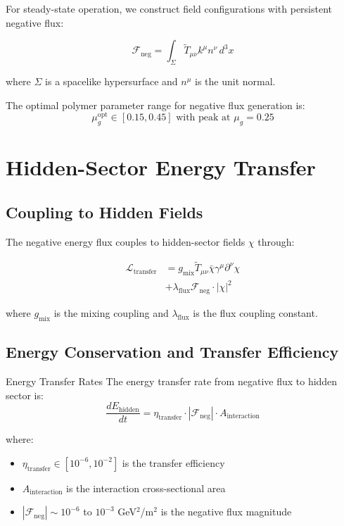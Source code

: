 \documentclass[12pt]{article}
\begin{document}
For steady-state operation, we construct field configurations with persistent negative flux:

\begin{equation}
\mathcal{F}_{\text{neg}} = \int_{\Sigma} \tilde{T}_{\mu\nu} k^{\mu} n^{\nu} \, d^3x
\end{equation}

where $\Sigma$ is a spacelike hypersurface and $n^{\mu}$ is the unit normal.

The optimal polymer parameter range for negative flux generation is:
\begin{equation}
\mu_g^{\text{opt}} \in [0.15, 0.45] \text{ with peak at } \mu_g = 0.25
\end{equation}

\section{Hidden-Sector Energy Transfer}

\subsection{Coupling to Hidden Fields}

The negative energy flux couples to hidden-sector fields $\chi$ through:

\begin{align}
\mathcal{L}_{\text{transfer}} &= g_{\text{mix}} \tilde{T}_{\mu\nu} \bar{\chi} \gamma^{\mu} \partial^{\nu} \chi \\
&+ \lambda_{\text{flux}} \mathcal{F}_{\text{neg}} \cdot |\chi|^2
\end{align}

where $g_{\text{mix}}$ is the mixing coupling and $\lambda_{\text{flux}}$ is the flux coupling constant.

\subsection{Energy Conservation and Transfer Efficiency}

\begin{resultbox}{Energy Transfer Rates}
The energy transfer rate from negative flux to hidden sector is:
\begin{equation}
\frac{dE_{\text{hidden}}}{dt} = \eta_{\text{transfer}} \cdot |\mathcal{F}_{\text{neg}}| \cdot A_{\text{interaction}}
\end{equation}

where:
\begin{itemize}
\item $\eta_{\text{transfer}} \in [10^{-6}, 10^{-2}]$ is the transfer efficiency
\item $A_{\text{interaction}}$ is the interaction cross-sectional area
\item $|\mathcal{F}_{\text{neg}}| \sim 10^{-6}$ to $10^{-3}$ GeV$^2$/m$^2$ is the negative flux magnitude
\end{itemize}
\end{resultbox}
\end{document}
